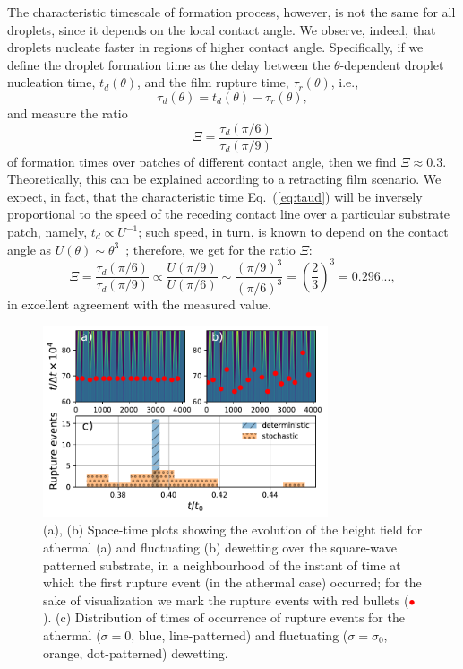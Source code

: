 The characteristic timescale of formation process, however, is not the same for all droplets, since it depends on the local contact angle.
We observe, indeed, that droplets nucleate faster in regions of higher contact angle. 
Specifically, if we define the droplet formation time as the delay between the $\theta$-dependent droplet nucleation time, $t_d(\theta)$, and the film rupture time, $\tau_r(\theta)$, i.e.,
\begin{equation}\label{eq:taud}
  \tau_d(\theta) = t_d(\theta) - \tau_r(\theta), 
\end{equation}
and measure the ratio
\begin{equation}\label{eq:time_ratio_delta8_substrate}
    \Xi = \frac{\tau_d(\pi/6)}{\tau_d(\pi/9)} 
\end{equation}
of formation times over patches of different contact angle, then we find $\Xi \approx 0.3$.
Theoretically, this can be explained according to a retracting film scenario. 
We expect, in fact, that the characteristic time Eq.~(\ref{eq:taud}) will be inversely proportional to the speed of the receding contact line over a particular substrate patch, namely, $t_d \propto U^{-1}$; such speed, in turn, is known to depend on the contact angle as $U(\theta) \sim \theta^3$~\cite{snoeijerAsymptoticAnalysisDewetting2010}; therefore, we get for the ratio $\Xi$:
\begin{equation}\label{eq:ratio_U_theta_qubed_1/3}
  \Xi = \frac{\tau_d(\pi/6)}{\tau_d(\pi/9)}  \propto  {\frac{U(\pi/9)}{U(\pi/6)} \sim \frac{\left(\pi/9\right)^3}{\left(\pi/6\right)^3} = \left(\frac{2}{3}\right)^3 = 0.296...},
\end{equation}
in excellent agreement with the measured value.
\begin{figure}
    \centering
    \includegraphics[width=0.75\textwidth]{graphics/Rupture_events_with_film.pdf}
    \caption{(a), (b) Space-time plots showing the evolution of the height field for athermal (a) and fluctuating (b) dewetting over the square-wave patterned substrate, in a neighbourhood of the instant of time at which the first rupture event (in the athermal case) occurred; for the sake of visualization we mark the rupture events with red bullets (\textcolor{red}{$\bullet$}).
    (c) Distribution of times of occurrence of rupture events for the athermal ($\sigma=0$, blue, line-patterned) and fluctuating ($\sigma = \sigma_0$, orange, dot-patterned) dewetting.} 
    \label{fig:rupture_time_distri_square_wave8}
\end{figure}

